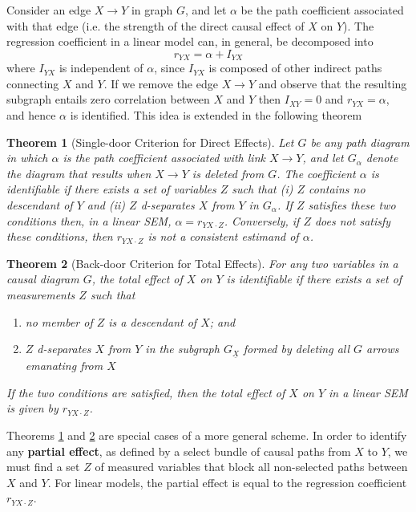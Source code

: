\documentclass[11pt]{article}
\numberwithin{equation}{section}
\newtheorem{thm}{Theorem}[section]
\begin{document}
Consider an edge $X \rightarrow Y$ in graph $G$, and let $\alpha$ be the path coefficient associated with that edge (i.e. the strength of the direct causal effect of $X$ on $Y$). The regression coefficient in a linear model can, in general, be decomposed into 
\begin{equation}
r_{YX} = \alpha + I_{YX}
\end{equation}
where $I_{YX}$ is independent of $\alpha$, since $I_{YX}$ is composed of other indirect paths connecting $X$ and $Y$. If we remove the edge $X \rightarrow Y$ and observe that the resulting subgraph entails zero correlation between $X$ and $Y$ then $I_{XY}=0$ and $r_{YX}=\alpha$, and hence $\alpha$ is identified. This idea is extended in the following theorem
\begin{thm}[Single-door Criterion for Direct Effects] 
Let $G$ be any path diagram in which $\alpha$ is the path coefficient associated with link $X \rightarrow Y$, and let $G_\alpha$ denote the diagram that results when $X\rightarrow Y$ is deleted from $G$. The coefficient $\alpha$ is identifiable if there exists a set of variables $Z$ such that (i) $Z$ contains no descendant of $Y$ and (ii) $Z$ d-separates $X$ from $Y$ in $G_\alpha$. If $Z$ satisfies these two conditions then, in a linear SEM, $\alpha = r_{YX\cdot Z}$. Conversely, if $Z$ does not satisfy these conditions, then $r_{YX\cdot Z}$ is not a consistent estimand of $\alpha$. \label{thm:single-door-direct-effect}
\end{thm}

\begin{thm}[Back-door Criterion for Total Effects]
For any two variables in a causal diagram $G$, the total effect of $X$ on $Y$ is identifiable if there exists a set of measurements $Z$ such that 
\begin{enumerate}
\item no member of $Z$ is a descendant of $X$; and
\item $Z$ d-separates $X$ from $Y$ in the subgraph $G_{\underline{X}}$ formed by deleting all $G$ arrows emanating from $X$
\end{enumerate}
If the two conditions are satisfied, then the total effect of $X$ on $Y$ in a linear SEM is given by $r_{YX\cdot Z}$. \label{thm:back-door-total-effect}
\end{thm}

Theorems \ref{thm:single-door-direct-effect} and \ref{thm:back-door-total-effect} are special cases of a more general scheme. In order to identify any \textbf{partial effect}, as defined by a select bundle of causal paths from $X$ to $Y$, we must find a set $Z$ of measured variables that block all non-selected paths between $X$ and $Y$. For linear models, the partial effect is equal to the regression coefficient $r_{YX\cdot Z}$.
\end{document}
